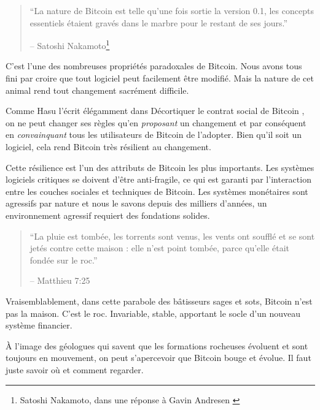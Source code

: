 \begin{quotation}\begin{samepage}
\enquote{La nature de Bitcoin est telle qu'une fois sortie la version 0.1, les
concepts essentiels étaient gravés dans le marbre pour le restant de ses jours.}
\begin{flushright} -- Satoshi Nakamoto\footnote{Satoshi Nakamoto, dans une
réponse à Gavin Andresen \cite{satoshi-centralized-nature}}
\end{flushright}\end{samepage}\end{quotation}

C'est l'une des nombreuses propriétés paradoxales de Bitcoin. Nous avons tous
fini par croire que tout logiciel peut facilement être modifié. Mais la nature
de cet animal rend tout changement sacrément difficile.

Comme Hasu l'écrit élégamment dans Décortiquer le contrat social de Bitcoin
\cite{social-contract}, on ne peut changer ses règles qu'en
\textit{proposant} un changement et par conséquent en \textit{convainquant} tous
les utilisateurs de Bitcoin de l'adopter. Bien qu'il soit un logiciel, cela rend
Bitcoin très résilient au changement.

Cette résilience est l'un des attributs de Bitcoin les plus importants. Les
systèmes logiciels critiques se doivent d'être anti-fragile, ce qui est garanti
par l'interaction entre les couches sociales et techniques de Bitcoin. Les
systèmes monétaires sont agressifs par nature et nous le savons depuis des
milliers d'années, un environnement agressif requiert des fondations solides.

\begin{quotation}\begin{samepage}
\enquote{La pluie est tombée, les torrents sont venus, les vents ont soufflé et
se sont jetés contre cette maison : elle n'est point tombée, parce qu'elle était
fondée sur le roc.}
\begin{flushright} -- Matthieu 7:25
\end{flushright}\end{samepage}\end{quotation}

Vraisemblablement, dans cette parabole des bâtisseurs sages et sots, Bitcoin
n'est pas la maison. C'est le roc. Invariable, stable, apportant le socle d'un
nouveau système financier.

À l'image des géologues qui savent que les formations rocheuses évoluent et sont
toujours en mouvement, on peut s'apercevoir que Bitcoin bouge et évolue. Il faut
juste savoir où et comment regarder.

